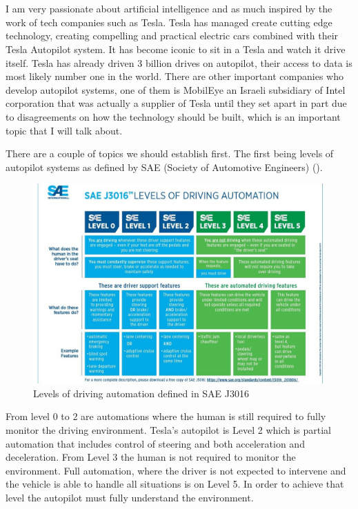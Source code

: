 \chapter{\bevezetes}

I am very passionate about artificial intelligence and as much inspired by the
work of tech companies such as Tesla. Tesla has managed create cutting edge
technology, creating compelling and practical electric cars combined with their
Tesla Autopilot system. It has become iconic to sit in a Tesla and watch it
drive itself. Tesla has already driven 3 billion drives on autopilot, their
access to data is most likely number one in the world. There are other important
companies who develop autopilot systems, one of them is MobilEye an Israeli
subsidiary of Intel corporation that was actually a supplier of Tesla until they
set apart in part due to disagreements on how the technology should be built,
which is an important topic that I will talk about.

There are a couple of topics we should establish first. The first being levels
of autopilot systems as defined by SAE (Society of Automotive Engineers)
(). 

\begin{figure}[!ht]
    \centering
    \includegraphics[width=150mm, keepaspectratio]{figures/levels-of-ad.jpg}
    \caption{Levels of driving automation defined in SAE J3016 \cite{j3016b}}
    \label{fig:J3016}
\end{figure}

From level 0 to 2 are automations where the human is still required to fully
monitor the driving environment. Tesla's autopilot is Level 2 which is partial
automation that includes control of steering and both acceleration and
deceleration. From Level 3 the human is not required to monitor the environment.
Full automation, where the driver is not expected to intervene and the vehicle
is able to handle all situations is on Level 5. In order to achieve that level
the autopilot must fully understand the environment.

